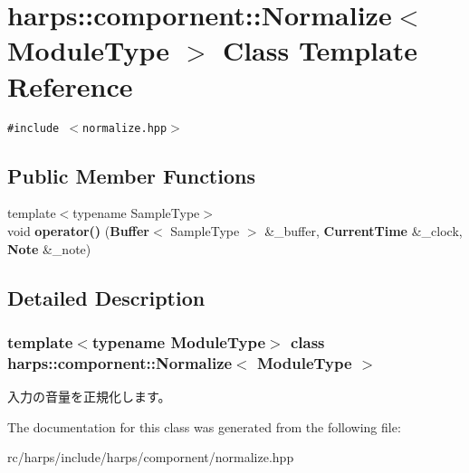 \section{harps::compornent::Normalize$<$ ModuleType $>$ Class Template Reference}
\label{classharps_1_1compornent_1_1Normalize}
{\tt \#include $<$normalize.hpp$>$}

\subsection*{Public Member Functions}
\begin{CompactItemize}
\item 
{\footnotesize template$<$typename SampleType$>$ }\\void \textbf{operator()} ({\bf Buffer}$<$ SampleType $>$ \&\_\-buffer, {\bf CurrentTime} \&\_\-clock, {\bf Note} \&\_\-note)\label{classharps_1_1compornent_1_1Normalize_19a3130399cf04518ad0be3e987d4bdb}

\end{CompactItemize}


\subsection{Detailed Description}
\subsubsection*{template$<$typename ModuleType$>$ class harps::compornent::Normalize$<$ ModuleType $>$}

入力の音量を正規化します。 

The documentation for this class was generated from the following file:\begin{CompactItemize}
\item 
rc/harps/include/harps/compornent/normalize.hpp\end{CompactItemize}
